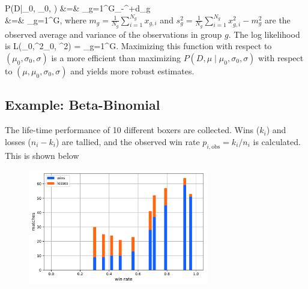 \begin{itemize}
	\ba
		P(D\;|\;\mu_0, \sigma_0, \sigma) 
		&=& 
		\prod_{g=1}^G\intop_{-\infty}^{+\infty}\!d\mu_g\,\left[\text{Normal}(\mu_g\;|\;\mu_0, \sigma_0^2) \times \prod_{i=1}^{N_g}\text{Normal}(x_{g,i}\;|\;\mu_g, \sigma^2)\right] 
		\\
		&=&
		\prod_{g=1}^G,
	\ea
	where $m_g = \frac{1}{N_g}\sum_{i=1}^{N_g} x_{g,i}$ and $s_g^2 = \frac{1}{N_g}\sum_{i=1}^{N_g} x_{g,i}^2 - m_g^2$ are the observed average and variance of the observations in group $g$.
	The log likelihood is
	\be
		L(\mu_0,\sigma^2_0, \sigma^2) = \sum_{g=1}^G.
	\ee
	Maximizing this function with respect to $(\mu_0, \sigma_0, \sigma)$ is a more efficient than maximizing $P(D,\mu\;|\;\mu_0, \sigma_0, \sigma)$ with respect to $(\mu, \mu_0, \sigma_0, \sigma)$ and yields more robust estimates.
\end{itemize}

\newpage
\subsection{Example: Beta-Binomial}
The life-time performance of 10 different boxers are collected. Wins ($k_i$) and losses ($n_i - k_i$) are tallied, and the observed win rate $p_{i,\text{obs}} = k_i / n_i$ is calculated. This is shown below
\begin{figure}[h]
\centering
	\includegraphics[width=0.7\textwidth]{./figs/04-betabinom-data.pdf}
\end{figure}

